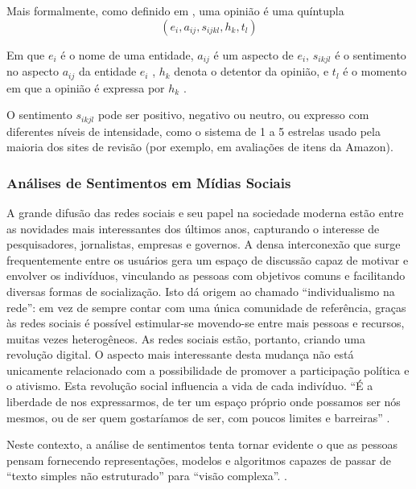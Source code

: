 \documentclass[
	12pt,				%
	openright,			%
	oneside,			%
	a4paper,			%
	english,			%
	spanish,			%
	brazil				%
	]{abntex2}
\begin{document}
Mais formalmente, como definido em \cite{bliu_2012}, uma opinião é uma quíntupla \[ \left ( e_{i}, a_{ij}, s_{ijkl},h_{k},t_{l} \right ) \]


Em que $e_{i}$ é o nome de uma entidade, $a_{ij}$ é um aspecto de $e_{i}$, $s_{ikjl}$ é o sentimento no aspecto $a_{ij}$  da entidade $e_{i}$ , $h_{k}$ denota o detentor da opinião, e $t_{l}$  é o momento em que a opinião é expressa por $h_{k}$ .

O sentimento $s_{ikjl}$ pode ser positivo, negativo ou neutro, ou expresso com diferentes níveis de intensidade, como o sistema de 1 a 5 estrelas usado pela maioria dos sites de revisão (por exemplo, em avaliações de itens da Amazon).


	\subsubsection*{Análises de Sentimentos em Mídias Sociais}
	
A grande difusão das redes sociais e seu papel na sociedade moderna estão entre as novidades mais interessantes dos últimos anos, capturando o interesse de pesquisadores, jornalistas, empresas e governos. A densa interconexão que surge frequentemente entre os usuários gera um espaço de discussão capaz de motivar e envolver os indivíduos, vinculando as pessoas com objetivos comuns e facilitando diversas formas de socialização. Isto dá origem ao chamado ``individualismo na rede'': em vez de sempre contar com uma única comunidade de referência, graças às redes sociais é possível estimular-se movendo-se entre mais pessoas e recursos, muitas vezes heterogêneos. As redes sociais estão, portanto, criando uma revolução digital. O aspecto mais interessante desta mudança não está unicamente relacionado com a possibilidade de promover a participação política e o ativismo. Esta revolução social influencia a vida de cada indivíduo. ``É a liberdade de nos expressarmos, de ter um espaço próprio onde possamos ser nós mesmos, ou de ser quem gostaríamos de ser, com poucos limites e barreiras'' \cite{book_sentiment_social}.

Neste contexto, a análise de sentimentos tenta tornar evidente o que as pessoas pensam fornecendo representações, modelos e algoritmos capazes de passar de ``texto simples não estruturado''  para ``visão complexa''. \cite{book_sentiment_social}.
\end{document}
